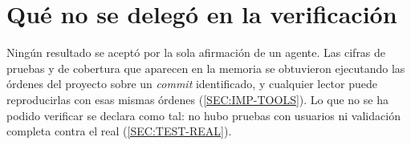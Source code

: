 \section*{Qué no se delegó en la verificación}

Ningún resultado se aceptó por la sola afirmación de un agente. Las cifras de pruebas y de
cobertura que aparecen en la memoria se obtuvieron ejecutando las órdenes del proyecto
sobre un \textit{commit} identificado, y cualquier lector puede reproducirlas con esas
mismas órdenes (\cref{SEC:IMP-TOOLS}). Lo que no se ha podido verificar se declara como
tal: no hubo pruebas con usuarios ni validación completa contra el  real
(\cref{SEC:TEST-REAL}).
